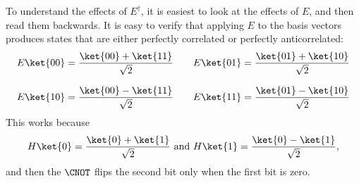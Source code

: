 %
To understand the effects of $E^\dag$, it is easiest to look at the effects of
$E$, and then read them backwards.  It is easy to verify that applying $E$ to
the basis vectors produces states that are either perfectly correlated or
perfectly anticorrelated: \[
\begin{array}{c@{\qquad}c}
  E\ket{00} = \dfrac{\ket{00} + \ket{11}}{\sqrt{2}} &
  E\ket{01} = \dfrac{\ket{01} + \ket{10}}{\sqrt{2}} \\[4ex]
  E\ket{10} = \dfrac{\ket{00} - \ket{11}}{\sqrt{2}} &
  E\ket{11} = \dfrac{\ket{01} - \ket{10}}{\sqrt{2}}
\end{array}
\] This works because \[ H\ket{0} = \frac{\ket{0} + \ket{1}}{\sqrt{2}}
\text{ and } H\ket{1} = \frac{\ket{0} - \ket{1}}{\sqrt{2}}, \] and then the
$\CNOT$ flips the second bit only when the first bit is zero.

